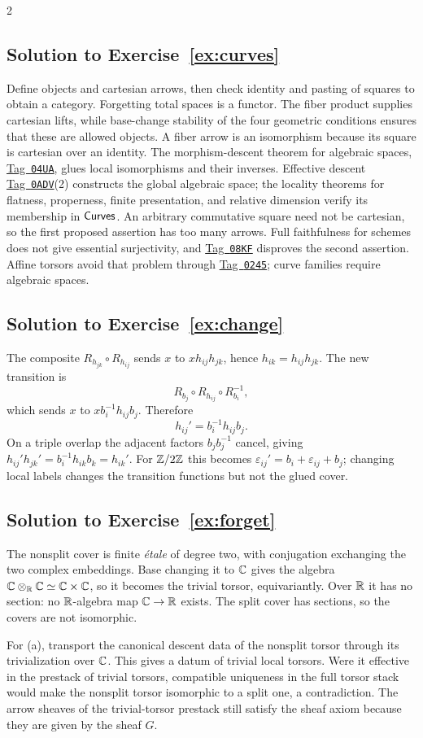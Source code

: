\documentclass[12pt]{memoir}
\newcommand{\BGtag}[1]{\href{https://stacks.math.columbia.edu/tag/#1}{Tag~\texttt{#1}}}
\newcommand{\BGsolution}[1]{\subsection*{Solution to Exercise~\ref{#1}}\label{sol:#1}}
\begin{document}
\begin{multicols}{2}
\BGsolution{ex:curves}
Define objects and cartesian arrows, then check identity and pasting of
squares to obtain a category. Forgetting total spaces is a functor.
The fiber product supplies cartesian lifts, while base-change stability
of the four geometric conditions ensures that these are allowed
objects. A fiber arrow is an isomorphism because its square is cartesian
over an identity. The morphism-descent theorem for algebraic spaces,
\BGtag{04UA}, glues local isomorphisms and their inverses. Effective
descent \BGtag{0ADV}(2) constructs the global algebraic space; the
locality theorems for flatness, properness, finite presentation, and
relative dimension verify its membership in $\mathsf{Curves}$.
An arbitrary commutative square need not be cartesian, so the first
proposed assertion has too many arrows. Full faithfulness for schemes
does not give essential surjectivity, and \BGtag{08KF} disproves the
second assertion. Affine torsors avoid that problem through
\BGtag{0245}; curve families require algebraic spaces.

\BGsolution{ex:change}
The composite $R_{h_{jk}}\circ R_{h_{ij}}$ sends $x$ to
$xh_{ij}h_{jk}$, hence $h_{ik}=h_{ij}h_{jk}$. The new transition is
\[
 R_{b_j}\circ R_{h_{ij}}\circ R_{b_i}^{-1},
\]
which sends $x$ to $xb_i^{-1}h_{ij}b_j$. Therefore
\[
 h_{ij}'=b_i^{-1}h_{ij}b_j.
\]
On a triple overlap the adjacent factors $b_jb_j^{-1}$ cancel,
giving $h_{ij}'h_{jk}'=b_i^{-1}h_{ik}b_k=h_{ik}'$.
For $\mathbb{Z}/2\mathbb{Z}$ this becomes
$\varepsilon_{ij}'=b_i+\varepsilon_{ij}+b_j$; changing local labels
changes the transition functions but not the glued cover.

\BGsolution{ex:forget}
The nonsplit cover is finite \emph{\'etale} of degree two, with conjugation
exchanging the two complex embeddings. Base changing it to $\mathbb{C}$ gives
the algebra $\mathbb{C}\otimes_{\mathbb{R}}\mathbb{C}\simeq\mathbb{C}\times\mathbb{C}$, so it becomes
the trivial torsor, equivariantly. Over $\mathbb{R}$ it has no section: no
$\mathbb{R}$-algebra map $\mathbb{C}\to\mathbb{R}$ exists. The split cover has sections,
so the covers are not isomorphic.

For (a), transport the canonical descent data of the nonsplit torsor
through its trivialization over $\mathbb{C}$. This gives a datum of trivial
local torsors. Were it effective in the prestack of trivial torsors,
compatible uniqueness in the full torsor stack would make the nonsplit
torsor isomorphic to a split one, a contradiction. The arrow sheaves
of the trivial-torsor prestack still satisfy the sheaf axiom because
they are given by the sheaf $G$.


\end{multicols}
\end{document}
